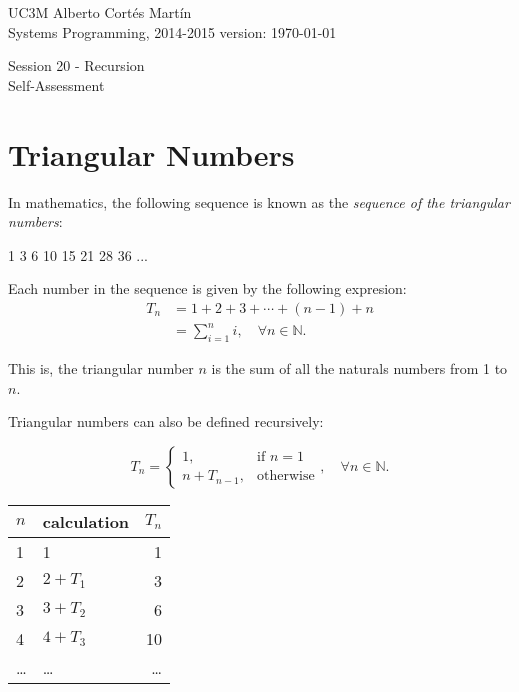 \documentclass[a4paper, 11pt]{article}
\newcommand{\realtitle}{Session 20 - Recursion}
\begin{document}
\makebox[\linewidth]{\rule{\textwidth}{0.4pt}}
UC3M \hfill Alberto Cortés Martín\\
Systems Programming, 2014-2015 \hfill version: \today\\
\makebox[\linewidth]{\rule{\textwidth}{0.4pt}}
\begin{center}
  \Large{\realtitle}\\Self-Assessment
\end{center}
\makebox[\linewidth]{\rule{\textwidth}{0.4pt}}
\vspace{1cm}

\section{Triangular Numbers}

In mathematics, the following sequence is known as the \emph{sequence of the
triangular numbers}:

\begin{center}
\begin{blackboard}
1 3 6 10 15 21 28 36 ...
\end{blackboard}
\end{center}

Each number in the sequence is given by the following expresion:
\begin{align*}
  T_n & = 1 + 2 + 3 + \cdots + (n-1) + n \\
      & = \sum_{i=1}^{n}i, \quad \forall n \in \mathbb{N}.
\end{align*}

This is, the triangular number $n$ is the sum of all the naturals numbers from
1 to $n$.

Triangular numbers can also be defined recursively:

\begin{multicols}{2}
\begin{equation*}
  T_n =
  \begin{cases}
    1,              & \text{if } n = 1\\
    n + T_{n-1},    & \text{otherwise}
  \end{cases}, \quad \forall n \in \mathbb{N}.
\end{equation*}

\columnbreak

\begin{center}
  \begin{tabular}{|l|l|r|}
    \hline
    $n$ & calculation & $T_n$\\
    \hline
    1   &           1 & 1 \\
    2   & $2 + T_1$   & 3 \\
    3   & $3 + T_2$   & 6 \\
    4   & $4 + T_3$   & 10 \\
    \ldots & \ldots & \ldots \\
    \hline
  \end{tabular}
\end{center}
\end{multicols}
\end{document}

